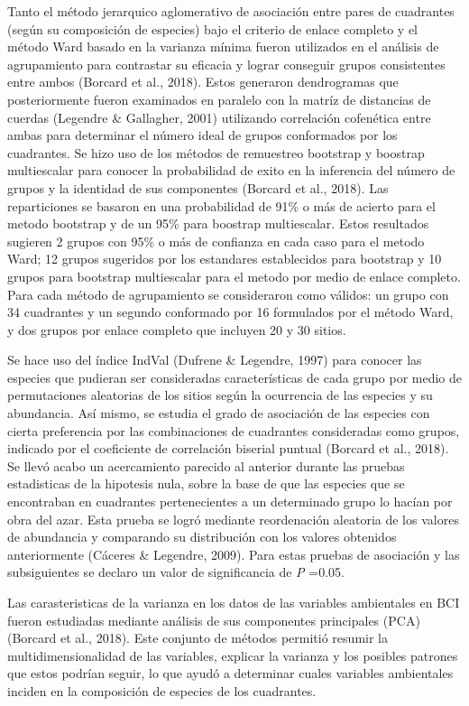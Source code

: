\documentclass[11pt,]{article}
\begin{document}
Tanto el método jerarquico aglomerativo de asociación entre pares de
cuadrantes (según su composición de especies) bajo el criterio de enlace
completo y el método Ward basado en la varianza mínima fueron utilizados
en el análisis de agrupamiento para contrastar su eficacia y lograr
conseguir grupos consistentes entre ambos (Borcard et al., 2018). Estos
generaron dendrogramas que posteriormente fueron examinados en paralelo
con la matríz de distancias de cuerdas (Legendre \& Gallagher, 2001)
utilizando correlación cofenética entre ambas para determinar el número
ideal de grupos conformados por los cuadrantes. Se hizo uso de los
métodos de remuestreo bootstrap y boostrap multiescalar para conocer la
probabilidad de exito en la inferencia del número de grupos y la
identidad de sus componentes (Borcard et al., 2018). Las reparticiones
se basaron en una probabilidad de 91\% o más de acierto para el metodo
bootstrap y de un 95\% para boostrap multiescalar. Estos resultados
sugieren 2 grupos con 95\% o más de confianza en cada caso para el
metodo Ward; 12 grupos sugeridos por los estandares establecidos para
bootstrap y 10 grupos para bootstrap multiescalar para el metodo por
medio de enlace completo. Para cada método de agrupamiento se
consideraron como válidos: un grupo con 34 cuadrantes y un segundo
conformado por 16 formulados por el método Ward, y dos grupos por enlace
completo que incluyen 20 y 30 sitios.

Se hace uso del índice IndVal (Dufrene \& Legendre, 1997) para conocer
las especies que pudieran ser consideradas características de cada grupo
por medio de permutaciones aleatorias de los sitios según la ocurrencia
de las especies y su abundancia. Así mismo, se estudia el grado de
asociación de las especies con cierta preferencia por las combinaciones
de cuadrantes consideradas como grupos, indicado por el coeficiente de
correlación biserial puntual (Borcard et al., 2018). Se llevó acabo un
acercamiento parecido al anterior durante las pruebas estadisticas de la
hipotesis nula, sobre la base de que las especies que se encontraban en
cuadrantes pertenecientes a un determinado grupo lo hacían por obra del
azar. Esta prueba se logró mediante reordenación aleatoria de los
valores de abundancia y comparando su distribución con los valores
obtenidos anteriormente (Cáceres \& Legendre, 2009). Para estas pruebas
de asociación y las subsiguientes se declaro un valor de significancia
de \emph{P} =0.05.

Las carasteristicas de la varianza en los datos de las variables
ambientales en BCI fueron estudiadas mediante análisis de sus
componentes principales (PCA)(Borcard et al., 2018). Este conjunto de
métodos permitió resumir la multidimensionalidad de las variables,
explicar la varianza y los posibles patrones que estos podrían seguir,
lo que ayudó a determinar cuales variables ambientales inciden en la
composición de especies de los cuadrantes.
\end{document}
